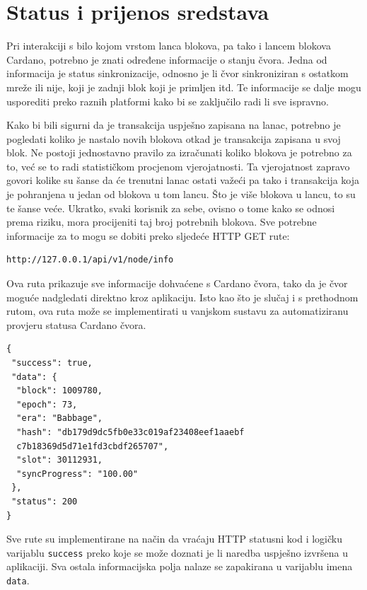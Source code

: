 \documentclass[times, utf8, diplomski]{fer}
\begin{document}
\section{Status i prijenos sredstava}

Pri interakciji s bilo kojom vrstom lanca blokova, pa tako i lancem blokova Cardano, potrebno je znati određene informacije o stanju čvora. Jedna od informacija je status sinkronizacije, odnosno je li čvor sinkroniziran s ostatkom mreže ili nije, koji je zadnji blok koji je primljen itd. Te informacije se dalje mogu usporediti preko raznih platformi kako bi se zaključilo radi li sve ispravno. 

Kako bi bili sigurni da je transakcija uspješno zapisana na lanac, potrebno je pogledati koliko je nastalo novih blokova otkad je transakcija zapisana u svoj blok. Ne postoji jednostavno pravilo za izračunati koliko blokova je potrebno za to, već se to radi statističkom procjenom vjerojatnosti. Ta vjerojatnost zapravo govori kolike su šanse da će trenutni lanac ostati važeći pa tako i transakcija koja je pohranjena u jedan od blokova u tom lancu. Što je više blokova u lancu, to su te šanse veće. Ukratko, svaki korisnik za sebe, ovisno o tome kako se odnosi prema riziku, mora procijeniti taj broj potrebnih blokova. Sve potrebne informacije za to mogu se dobiti preko sljedeće HTTP GET rute:

\begin{verbatim}
http://127.0.0.1/api/v1/node/info
\end{verbatim}

Ova ruta prikazuje sve informacije dohvaćene s Cardano čvora, tako da je čvor moguće nadgledati direktno kroz aplikaciju. Isto kao što je slučaj i s prethodnom rutom, ova ruta može se implementirati u vanjskom sustavu za automatiziranu provjeru statusa Cardano čvora.

\begin{lstlisting}
{
 "success": true,
 "data": {
  "block": 1009780,
  "epoch": 73,
  "era": "Babbage",
  "hash": "db179d9dc5fb0e33c019af23408eef1aaebf
  c7b18369d5d71e1fd3cbdf265707",
  "slot": 30112931,
  "syncProgress": "100.00"
 },
 "status": 200
}
\end{lstlisting}

Sve rute su implementirane na način da vraćaju HTTP statusni kod i logičku varijablu \texttt{success} preko koje se može doznati je li naredba uspješno izvršena u aplikaciji. Sva ostala informacijska polja nalaze se zapakirana u varijablu imena \texttt{data}.
\end{document}
